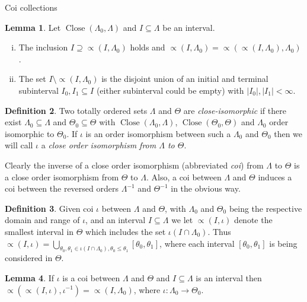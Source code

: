 \documentclass{amsart}
\theoremstyle{definition}\newtheorem{theorem}{Theorem}
\theoremstyle{definition}\newtheorem*{A}{Main Theorem}
\theoremstyle{definition}\newtheorem*{B}{Theorem \ref{elementaryequiv}}
\theoremstyle{definition}\newtheorem*{C}{Theorem \ref{continuous}}
\theoremstyle{definition}\newtheorem*{D}{Theorem \ref{bigisomorphism2}}
\theoremstyle{definition}\newtheorem{bigtheorem}{Main Theorem}
\numberwithin{theorem}{section}
\theoremstyle{definition}\newtheorem{corollary}[theorem]{Corollary}
\theoremstyle{definition}\newtheorem{proposition}[theorem]{Proposition}
\theoremstyle{definition}\newtheorem{definition}[theorem]{Definition}
\theoremstyle{definition}\newtheorem{question}[theorem]{Question}
\theoremstyle{definition}\newtheorem{example}[theorem]{Example}
\theoremstyle{definition}\newtheorem{remark}[theorem]{Remark}
\theoremstyle{definition}\newtheorem{note}[theorem]{Note}
\theoremstyle{definition}\newtheorem{lemma}[theorem]{Lemma}
\theoremstyle{definition}\newtheorem{fact}[theorem]{Fact}
\theoremstyle{definition}\newtheorem{define}[theorem]{Definition}
\theoremstyle{definition}\newtheorem{claim}[theorem]{Claim}
\theoremstyle{definition}\newtheorem{obs}[theorem]{Observation}
\theoremstyle{definition}\newtheorem{definitions}[theorem]{Definitions}
\newcommand{\Close}{\operatorname{Close}}
\begin{document}
\begin{section}{Coi collections}
\begin{lemma}\label{prettyclose} Let $\Close(\Lambda_0, \Lambda)$ and $I \subseteq \Lambda$ be an interval.

\begin{enumerate}[(i)]

\item The inclusion $I \supseteq \varpropto(I, \Lambda_0)$ holds and $\varpropto(I, \Lambda_0) = \varpropto(\varpropto(I, \Lambda_0), \Lambda_0)$.

\item  The set $I \setminus \varpropto(I, \Lambda_0)$ is the disjoint union of an initial and terminal subinterval $I_0, I_1 \subseteq I$ (either subinterval could be empty) with $|I_0|, |I_1| < \infty$.
\end{enumerate}

\end{lemma}

\begin{definition}  Two totally ordered sets $\Lambda$ and $\Theta$ are \emph{close-isomorphic} if there exist $\Lambda_0 \subseteq \Lambda$ and $\Theta_0 \subseteq \Theta$ with $\Close(\Lambda_0, \Lambda)$, $\Close(\Theta_0, \Theta)$ and $\Lambda_0$ order isomorphic to $\Theta_0$.  If $\iota$ is an order isomorphism between such a $\Lambda_0$ and $\Theta_0$ then we will call $\iota$ a \emph{close order isomorphism from $\Lambda$ to $\Theta$}.
\end{definition}

Clearly the inverse of a close order isomorphism (abbreviated \emph{coi}) from $\Lambda$ to $\Theta$ is a close order isomorphism from $\Theta$ to $\Lambda$.  Also, a coi between $\Lambda$ and $\Theta$ induces a coi between the reversed orders $\Lambda^{-1}$ and $\Theta^{-1}$ in the obvious way.

\begin{definition}  Given coi $\iota$ between $\Lambda$ and $\Theta$, with $\Lambda_0$ and $\Theta_0$ being the respective domain and range of $\iota$, and an interval $I \subseteq \Lambda$ we let $\varpropto(I, \iota)$ denote the smallest interval in $\Theta$ which includes the set $\iota(I \cap \Lambda_0)$.  Thus  $\varpropto(I, \iota) = \bigcup_{\theta_0, \theta_1 \in \iota(I \cap \Lambda_0), \theta_0 \leq \theta_1} [\theta_0, \theta_1]$, where each interval $[\theta_0, \theta_1]$ is being considered in $\Theta$.
\end{definition}


\begin{lemma}\label{almostidentified}  If $\iota$ is a coi between $\Lambda$ and $\Theta$ and $I \subseteq \Lambda$ is an interval then $\varpropto(\varpropto(I, \iota), \iota^{-1}) = \varpropto(I, \Lambda_0)$, where $\iota: \Lambda_0 \rightarrow \Theta_0$.
\end{lemma}


\end{section}
\end{document}
